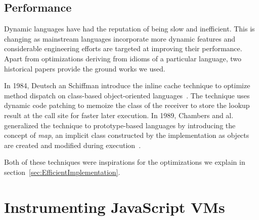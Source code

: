 \subsection{Performance}

Dynamic languages have had the reputation of being slow and inefficient. This
is changing as mainstream languages incorporate more dynamic features and
considerable engineering efforts are targeted at improving their performance.
Apart from optimizations deriving from idioms of a particular language, two
historical papers provide the ground works we used.

In 1984, Deutsch an Schiffman introduce the inline cache technique to optimize
method dispatch on class-based object-oriented languages~\cite{Deutsch:1984}.
The technique uses dynamic code patching to memoize the class of the receiver
to store the lookup result at the call site for faster later execution. In
1989, Chambers and al. generalized the technique to prototype-based languages
by introducing the concept of \textit{map}, an implicit class constructed by
the implementation as objects are created and modified during
execution~\cite{self}.

Both of these techniques were inspirations for the optimizations we explain in
section~\ref{sec:EfficientImplementation}.

\section{Instrumenting JavaScript VMs}


